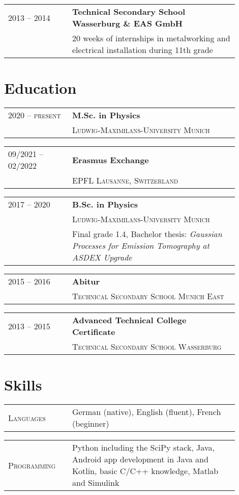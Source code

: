 \documentclass[a4paper, ]{article}
\newenvironment{cventry}[2]
{   
    \setlength{\tabcolsep}{1.25em}
    \hypersetup{urlcolor=black}
    \begin{center}\hspace{-1.25cm}\begin{tabular}{p{0.25\linewidth}|p{0.65\linewidth}}
    \raggedleft\scshape #1 & \bfseries#2 \vspace{0.1cm}\\ & 
}
{\end{tabular}\end{center}}
\newenvironment{cventrynoheading}[1]
{
    \setlength{\tabcolsep}{1.25em}
    \begin{center}\hspace{-1.25cm}\begin{tabular}{p{0.25\linewidth}|p{0.65\linewidth}}
    \raggedleft\scshape #1 & 
}
{\end{tabular}\end{center}}
\newcommand{\newentryline}{\\&}
\begin{document}
\begin{cventry}{2013 -- 2014}
    {Technical Secondary School Wasserburg \& EAS GmbH}
    20 weeks of internships in metalworking and electrical installation
    during 11th grade
\end{cventry}


\section{Education}

\begin{cventry}{2020 -- present}
    {M.Sc. in Physics}
    \scshape Ludwig-Maximilans-University Munich
\end{cventry}

\begin{cventry}{09/2021 -- 02/2022}
    {Erasmus Exchange}
    \scshape EPFL Lausanne, Switzerland
\end{cventry}

\begin{cventry}{2017 -- 2020}
    {B.Sc. in Physics}
    \scshape Ludwig-Maximilans-University Munich \newentryline Final grade 1.4, 
    Bachelor thesis: \slshape Gaussian Processes for Emission Tomography at 
    ASDEX Upgrade \href{https://gitlab.mpcdf.mpg.de/komo/bachelorarbeit}{\normalfont\faLink}
\end{cventry}

\begin{cventry}{2015 -- 2016}
    {Abitur}
    \scshape  Technical Secondary School Munich East
\end{cventry}

\begin{cventry}{2013 -- 2015}
    {Advanced Technical College Certificate}
    \scshape Technical Secondary School Wasserburg
\end{cventry}


\section{Skills}

\begin{cventrynoheading}{Languages}
    German (native), English (fluent), French (beginner)
\end{cventrynoheading}

\begin{cventrynoheading}{Programming}
    Python including the SciPy stack, Java, Android app development 
    in Java and Kotlin, basic C/C++ knowledge, Matlab and Simulink
\end{cventrynoheading}
\end{document}
